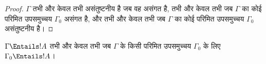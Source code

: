 \documentclass[../../../include/open-logic-section]{subfiles}
\begin{document}
\begin{proof}
$\Gamma$ तभी और केवल तभी असंतुष्टनीय है जब वह असंगत है, तभी और केवल तभी जब
  $\Gamma$ का कोई परिमित उपसमुच्चय $\Gamma_0$ असंगत है, और तभी और केवल तभी
  जब $\Gamma$ का कोई परिमित उपसमुच्चय $\Gamma_0$ असंतुष्टनीय है।
\end{proof}

\begin{cor}
$\Gamma \Entails !A$ तभी और केवल तभी जब $\Gamma$ के किसी परिमित उपसमुच्चय
$\Gamma_0$ के लिए $\Gamma_0 \Entails !A$।
\end{cor}
\end{document}

